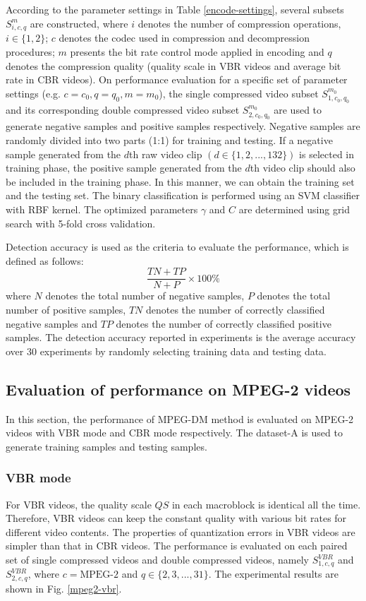 \documentclass[journal,sort]{IEEEtran}
\begin{document}
According to the parameter settings in Table \ref{encode-settings}, several subsets $S_{i,c,q}^m$ are constructed, where $i$ denotes the number of compression operations, $i\in \{1,2\}$; $c$ denotes the codec used in compression and decompression procedures; $m$ presents the bit rate control mode applied in encoding and $q$ denotes the compression quality (quality scale in VBR videos and average bit rate in CBR videos). On performance evaluation for a specific set of parameter settings (e.g. $c = c_0,q=q_0,m=m_0$), the single compressed video subset $S_{1,c_0,q_0}^{m_0}$ and its corresponding double compressed video subset $S_{2,c_0,q_0}^{m_0}$ are used to generate negative samples and positive samples respectively. Negative samples are randomly divided into two parts (1:1) for training and testing.
If a negative sample generated from the $d$th raw video clip $(d\in\{1,2,...,132\})$ is selected in training phase, the positive sample generated from the $d$th video clip should also be included in the training phase. 
In this manner, we can obtain the training set and the testing set. The binary classification is performed using an SVM classifier with RBF kernel. The optimized parameters $\gamma$ and $C$ are determined using grid search with 5-fold cross validation.

Detection accuracy is used as the criteria to evaluate the performance, which is defined as follows:
\begin{equation}
\frac{TN+TP}{N+P}\times 100 \% 
\end{equation}
where $N$ denotes the total number of negative samples, $P$ denotes the total number of positive samples, $TN$ denotes the number of correctly classified negative samples and $TP$ denotes the number of correctly classified positive samples. The detection accuracy reported in experiments is the average accuracy over 30 experiments by randomly selecting training data and testing data.



\subsection{Evaluation of performance on MPEG-2 videos\label{evaluation_mpeg2_all}}
In this section, the performance of MPEG-DM method is evaluated on MPEG-2 videos with VBR mode and CBR mode respectively. The dataset-A is used to generate training samples and testing samples. 

\subsubsection{VBR mode}
For VBR videos, the quality scale $QS$ in each macroblock is identical all the time. Therefore, VBR videos can keep the constant quality with various bit rates for different video contents. The properties of quantization errors in VBR videos are simpler than that in CBR videos. The performance is evaluated on each paired set of single compressed videos and double compressed videos, namely $S_{1,c,q}^{VBR}$ and $S_{2,c,q}^{VBR}$, where $c= \text{MPEG-2}$ and $q\in\{2,3,...,31\}$. The experimental results are shown in Fig. \ref{mpeg2-vbr}.
\end{document}
